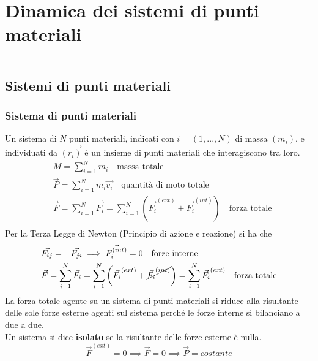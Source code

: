 \documentclass[twoside]{article}
\begin{document}
\hrulefill
\newpage

\section{Dinamica dei sistemi di punti materiali}
\rule{\linewidth/2}{0.5pt}
\subsection{Sistemi di punti materiali}
\subsubsection{Sistema di punti materiali}
Un sistema di $N$ punti materiali, indicati con $i = (1,...,N)$ di massa $(m_i)$, e individuati da $\vec{(r_i)}$ è un insieme di punti materiali che interagiscono tra loro.\\
\begin{align*}
   & M = \sum_{i=1}^{N} m_i \quad \text{massa totale}                                                                                 \\
   & \vec{P} = \sum_{i=1}^{N} m_i \vec{v_i} \quad \text{quantità di moto totale}                                                      \\
   & \vec{F} = \sum_{i=1}^{N} \vec{F_i} = \sum_{i=1}^{N} \left(\vec{F_i}^{(ext)} + \vec{F_i}^{(int)}\right) \quad \text{forza totale} \\
\end{align*}
Per la Terza Legge di Newton (Principio di azione e reazione) si ha che
\begin{align*}
   & \vec{F_{ij}} = - \vec{F_{ji}} \implies \vec{F_{i}^{(int)}} = 0 \quad \text{forze interne}                                                                                    \\
   & \vec{F} = \sum_{i=1}^{N} \vec{F_i} = \sum_{i=1}^{N} \left(\vec{F_i}^{(ext)} + \cancel{\vec{F_i}^{(int)}}\right) = \sum_{i=1}^{N} \vec{F_i}^{(ext)} \quad \text{forza totale}
\end{align*}
La forza totale agente su un sistema di punti materiali si riduce alla risultante delle sole forze esterne agenti sul sistema perché le forze interne si bilanciano a due a due.\\
Un sistema si dice \textbf{isolato} se la risultante delle forze esterne  è nulla.
\begin{equation*}
  \vec{F}^{(ext)} = 0 \implies \vec{F} = 0 \implies \vec{P} = costante
\end{equation*}
\end{document}
